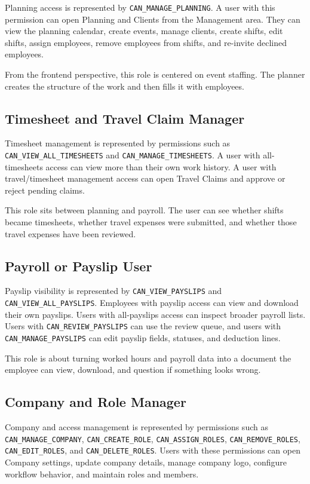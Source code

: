 \documentclass[11pt]{article}
\newcommand{\code}[1]{\nolinkurl{#1}}
\begin{document}
Planning access is represented by \code{CAN_MANAGE_PLANNING}. A user with this permission can open Planning and Clients from the Management area. They can view the planning calendar, create events, manage clients, create shifts, edit shifts, assign employees, remove employees from shifts, and re-invite declined employees.

From the frontend perspective, this role is centered on event staffing. The planner creates the structure of the work and then fills it with employees.

\subsection{Timesheet and Travel Claim Manager}

Timesheet management is represented by permissions such as \code{CAN_VIEW_ALL_TIMESHEETS} and \code{CAN_MANAGE_TIMESHEETS}. A user with all-timesheets access can view more than their own work history. A user with travel/timesheet management access can open Travel Claims and approve or reject pending claims.

This role sits between planning and payroll. The user can see whether shifts became timesheets, whether travel expenses were submitted, and whether those travel expenses have been reviewed.

\subsection{Payroll or Payslip User}

Payslip visibility is represented by \code{CAN_VIEW_PAYSLIPS} and \code{CAN_VIEW_ALL_PAYSLIPS}. Employees with payslip access can view and download their own payslips. Users with all-payslips access can inspect broader payroll lists. Users with \code{CAN_REVIEW_PAYSLIPS} can use the review queue, and users with \code{CAN_MANAGE_PAYSLIPS} can edit payslip fields, statuses, and deduction lines.

This role is about turning worked hours and payroll data into a document the employee can view, download, and question if something looks wrong.

\subsection{Company and Role Manager}

Company and access management is represented by permissions such as \code{CAN_MANAGE_COMPANY}, \code{CAN_CREATE_ROLE}, \code{CAN_ASSIGN_ROLES}, \code{CAN_REMOVE_ROLES}, \code{CAN_EDIT_ROLES}, and \code{CAN_DELETE_ROLES}. Users with these permissions can open Company settings, update company details, manage company logo, configure workflow behavior, and maintain roles and members.
\end{document}

